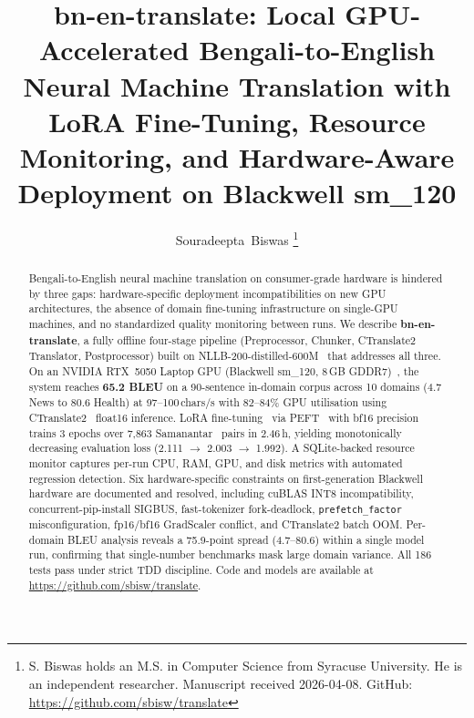 \documentclass[journal]{IEEEtran}
\newcommand{\TRAINDURATION}{2.46\,h}
\begin{document}

\title{bn-en-translate: Local GPU-Accelerated Bengali-to-English Neural
Machine Translation with LoRA Fine-Tuning, Resource Monitoring,
and Hardware-Aware Deployment on Blackwell sm\_120}

\author{Souradeepta~Biswas
\thanks{S. Biswas holds an M.S. in Computer Science from Syracuse University.
He is an independent researcher.
Manuscript received 2026-04-08.
GitHub: \url{https://github.com/sbisw/translate}}}

\maketitle
\IEEEpeerreviewmaketitle

\begin{abstract}
Bengali-to-English neural machine translation on consumer-grade hardware
is hindered by three gaps: hardware-specific deployment incompatibilities
on new GPU architectures, the absence of domain fine-tuning infrastructure
on single-GPU machines, and no standardized quality monitoring between runs.
We describe \textbf{bn-en-translate}, a fully offline four-stage pipeline
(Preprocessor, Chunker, CTranslate2 Translator, Postprocessor) built on
NLLB-200-distilled-600M~\cite{nllb2022} that addresses all three.
On an NVIDIA RTX~5050 Laptop GPU (Blackwell sm\_120, 8\,GB GDDR7)~\cite{nvidia_blackwell},
the system reaches \textbf{65.2 BLEU} on a 90-sentence in-domain corpus across
10 domains (4.7 News to 80.6 Health) at 97--100\,chars/s with 82--84\% GPU
utilisation using CTranslate2~\cite{ctranslate2_klein} float16 inference.
LoRA fine-tuning~\cite{hu2021lora} via PEFT~\cite{peft2022} with bf16
precision trains 3 epochs over 7,863 Samanantar~\cite{samanantar2022} pairs
in \TRAINDURATION, yielding monotonically decreasing evaluation loss
(2.111 $\to$ 2.003 $\to$ 1.992).
A SQLite-backed resource monitor captures per-run CPU, RAM, GPU, and disk metrics
with automated regression detection.
Six hardware-specific constraints on first-generation Blackwell hardware are
documented and resolved, including cuBLAS INT8 incompatibility, concurrent-pip-install
SIGBUS, fast-tokenizer fork-deadlock, \texttt{prefetch\_factor} misconfiguration,
fp16/bf16 GradScaler conflict, and CTranslate2 batch OOM.
Per-domain BLEU analysis reveals a 75.9-point spread (4.7--80.6) within a single model
run, confirming that single-number benchmarks mask large domain variance.
All 186 tests pass under strict TDD discipline.
Code and models are available at \url{https://github.com/sbisw/translate}.
\end{abstract}
\end{document}

